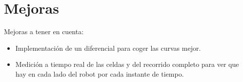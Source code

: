 \chapter{Mejoras}
Mejoras a tener en cuenta:
\begin{itemize}
	\item Implementación de un diferencial para coger las curvas mejor.
	\item Medición a tiempo real de las celdas y del recorrido completo para ver que hay en cada lado del robot por cada instante de tiempo.
\end{itemize}